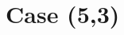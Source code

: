 \documentclass[10pt,reqno]{amsart}
\newcommand{\CC}{\mathbb{C}}
\theoremstyle{definition}
\begin{document}


\section{Case (5,3)}\label{sec:(5,3)}
\end{document}
